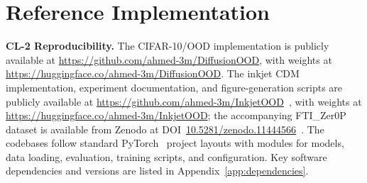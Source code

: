 
\section{Reference Implementation}
\label{sec:impl:reference_impl}

\noindent\textbf{CL-2 Reproducibility.}
The CIFAR-10/OOD implementation is publicly available at \url{https://github.com/ahmed-3m/DiffusionOOD}, with weights at \url{https://huggingface.co/ahmed-3m/DiffusionOOD}. The inkjet CDM implementation, experiment documentation, and figure-generation scripts are publicly available at \url{https://github.com/ahmed-3m/InkjetOOD}~\cite{mohammed2026inkjetood}, with weights at \url{https://huggingface.co/ahmed-3m/InkjetOOD}; the accompanying FTI\_Zer0P dataset is available from Zenodo at DOI~\href{https://doi.org/10.5281/zenodo.11444566}{10.5281/zenodo.11444566}~\citep{profactor2024fti}. The codebases follow standard PyTorch~\cite{paszke2019pytorch} project layouts with modules for models, data loading, evaluation, training scripts, and configuration. Key software dependencies and versions are listed in Appendix~\ref{app:dependencies}.
\endgroup
